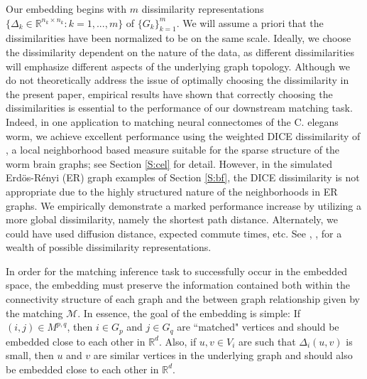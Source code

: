 \documentclass[12pt]{article}
\numberwithin{equation}{section}
\theoremstyle{definition}
\newtheorem{remark}[theorem]{Remark}
\newcommand{\gD}{{\Delta}}
\newcommand{\begr}{\begin{remark}}
\newcommand{\enr}{\end{remark}}
\begin{document}
Our embedding begins with $m$ dissimilarity representations $\{\Delta_k\in \mathbb{R}^{n_k\times n_k} : k=1 ,..., m \}$ of $\{G_k\}_{k=1}^{m}$.
We will assume a priori that the dissimilarities have been normalized to be on the same scale.  Ideally, we choose the dissimilarity dependent on the nature of the data, as different dissimilarities will emphasize different aspects of the underlying graph topology.
Although we do not theoretically address the issue of optimally choosing the dissimilarity in the present paper, empirical results have shown that correctly choosing the dissimilarities is essential to the performance of our downstream matching task.  Indeed, in one application to matching neural connectomes of the C. elegans worm, we achieve excellent performance using the weighted DICE dissimilarity of \cite{dice}, a local neighborhood based measure suitable for the sparse structure of the worm brain graphs; see Section \ref{S:cel} for detail.
However, in the simulated Erd\"os-R\'enyi (ER) graph examples of Section \ref{S:bf}, the DICE dissimilarity is not appropriate due to the highly structured nature of the neighborhoods in ER graphs.  We empirically demonstrate a marked performance increase by utilizing a more global dissimilarity, namely the shortest path distance.  Alternately, we could have used diffusion distance, expected commute times, etc.
See
\cite{diffdist}, \cite{dis1}, \cite{dis2} for a wealth of possible dissimilarity representations.



In order for the matching inference task to successfully occur in the embedded space, the embedding must preserve the  information contained both within the connectivity structure of each graph and the between graph relationship given by the matching $\mathcal{M}$.
In essence, the goal of the embedding is simple:  If $(i,j)\in M^{p,q}$, then $i \in G_p$ and $j \in G_q$ are ``matched" vertices and should be embedded close to each other in $\mathbb{R}^d$.  Also, if $u,v\in V_i$ are such that $\gD_i(u,v)$ is small, then $u$ and $v$ are similar vertices in the underlying graph and should also be embedded close to each other in $\mathbb{R}^d$.
\end{document}
